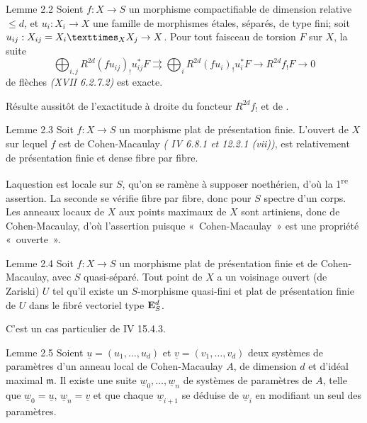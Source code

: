 \documentclass[10pt]{../fichiers-configuration-latex/smfart}
\begin{document}
\begin{enonce*}{Lemme 2.2}
Soient $f:X\rightarrow S$ un morphisme compactifiable de dimension
relative $\leq d$, et $u_{i}:X_{i}\rightarrow X$ une famille de
morphismes étales, séparés, de type fini; soit
$u_{ij}:X_{ij}=\fprod{X_{i}}{X_{j}}{X}\rightarrow X$. Pour tout
faisceau de torsion $F$ sur $X$, la suite
$$
\bigoplus_{i,j} R^{2d}(fu_{ij})_{!}u^{\ast}_{ij}F\rightrightarrows
\bigoplus_{i} R^{2d}(fu_{i})_{!}u^{\ast}_{i}F\rightarrow
R^{2d}f_{!}F\rightarrow 0
$$
de flèches \emph{(XVII 6.2.7.2)} est exacte.
\end{enonce*}

Résulte aussitôt de l'exactitude à droite du foncteur $R^{2d}f_{!}$ et
de .

\begin{enonce*}{Lemme 2.3}
Soit $f:X\rightarrow S$ un morphisme plat de présentation
finie. L'ouvert de $X$ sur lequel $f$ est de Cohen-Macaulay \emph{(\EGA
IV 6.8.1 et 12.2.1 (vii))}, est relativement de présentation finie et
dense fibre par fibre.
\end{enonce*}

La\pageoriginale question est locale sur $S$, qu'on se ramène à
supposer noethérien, d'où la 1\textsuperscript{re} assertion. La seconde se vérifie
fibre par fibre, donc pour $S$ spectre d'un corps. Les anneaux locaux
de $X$ aux points maximaux de $X$ sont artiniens, donc de
Cohen-Macaulay, d'où l'assertion puisque « Cohen-Macaulay »  est
une propriété « ouverte ».

\begin{enonce*}{Lemme 2.4}
Soit $f:X\rightarrow S$ un morphisme plat de présentation finie et de
Cohen-Macaulay, avec $S$ quasi-séparé. Tout point de $X$ a un
voisinage ouvert (de Zariski) $U$ tel qu'il existe un $S$-morphisme
quasi-fini et plat de présentation finie de $U$ dans le fibré vectoriel
type $\mathbf{E}^{d}_{S}$.
\end{enonce*}

C'est un cas particulier de \EGA IV 15.4.3.

\begin{enonce*}{Lemme 2.5}
Soient $\underline{u}=(u_{1},\ldots,u_{d})$ et $\underline{v}=(v_{1},\ldots,v_{d})$
deux systèmes de paramètres d'un anneau local de Cohen-Macaulay $A$,
de dimension $d$ et d'idéal maximal $\mathfrak{m}$. Il existe une suite
$\underline{w}_{0},\ldots,\underline{w}_{n}$ de systèmes de paramètres de $A$, telle que
$\underline{w}_{0}=\underline{u}$, $\underline{w}_{n}=\underline{v}$ et que
chaque $\underline{w}_{i+1}$ se
déduise de $\underline{w}_{i}$ en modifiant un seul des paramètres.
\end{enonce*}
\end{document}
